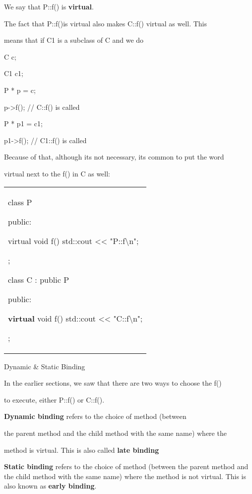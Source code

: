 We say that P::f() is \textbf{virtual}.

The fact that P::f()is virtual also makes C::f() virtual as well. This

means that if C1 is a subclass of C and we do

C c;

C1 c1;

P * p = c;

p-\textgreater f(); // C::f() is called

P * p1 = c1;

p1-\textgreater f(); // C1::f() is called

Because of that, although it\textquotesingle s not necessary,
it\textquotesingle s common to put the word

virtual next to the f() in C as well:

\begin{longtable}[]{@{}
  >{\raggedright\arraybackslash}p{}@{}}
\toprule\noalign{}
 \\
\midrule\noalign{}
\endhead
\bottomrule\noalign{}
\endlastfoot
class P

{

public:

virtual void f() { std::cout <<{}
"P::f\textbackslash n"; }

};

class C : public P

{

public:

\textbf{ virtual }void f() { std::cout <<{}
"C::f\textbackslash n"; }

}; \\
\end{longtable}

Dynamic \& Static Binding

In the earlier sections, we saw that there are two ways to choose the
f()

to execute, either P::f() or C::f().

\textbf{Dynamic binding }refers to the choice of method (between

the parent method and the child method with the same name) where the

method is virtual. This is also called \textbf{late binding}

\textbf{Static binding }refers to the choice of method (between the
parent method and the child method with the same name) where the method
is not virtual. This is also known as \textbf{early binding}.

